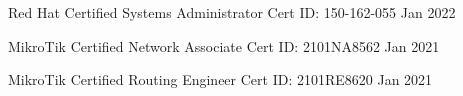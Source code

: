 

\begin{cvcerts}

    \cvcert
    {Red Hat Certified Systems Administrator} %
    {Cert ID: 150-162-055} %
    {Jan 2022} %


    \cvcert
    {MikroTik Certified Network Associate} %
    {Cert ID: 2101NA8562} %
    {Jan 2021} %

    \cvcert
    {MikroTik Certified Routing Engineer} %
    {Cert ID: 2101RE8620} %
    {Jan 2021} %

\end{cvcerts}

